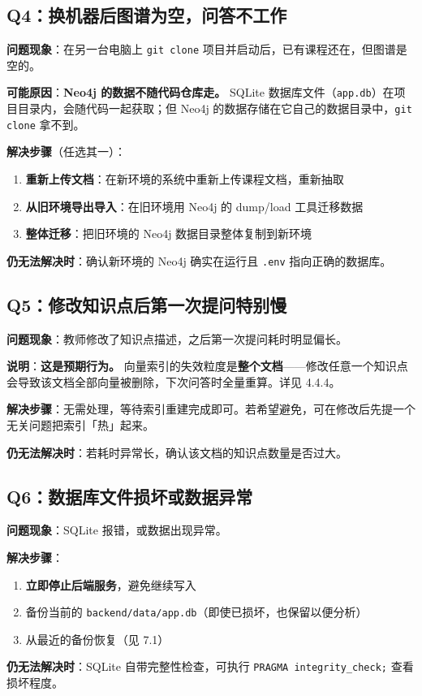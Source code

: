 \documentclass[UTF8,a4paper,11pt]{ctexrep}
\begin{document}
\subsection{Q4：换机器后图谱为空，问答不工作}

\textbf{问题现象}：在另一台电脑上 \texttt{git clone} 项目并启动后，已有课程还在，但图谱是空的。

\textbf{可能原因}：\textbf{Neo4j 的数据不随代码仓库走。} SQLite 数据库文件（\texttt{app.db}）在项目目录内，会随代码一起获取；但 Neo4j 的数据存储在它自己的数据目录中，\texttt{git clone} 拿不到。

\textbf{解决步骤}（任选其一）：

\begin{enumerate}
\item \textbf{重新上传文档}：在新环境的系统中重新上传课程文档，重新抽取
\item \textbf{从旧环境导出导入}：在旧环境用 Neo4j 的 dump/load 工具迁移数据
\item \textbf{整体迁移}：把旧环境的 Neo4j 数据目录整体复制到新环境
\end{enumerate}
\textbf{仍无法解决时}：确认新环境的 Neo4j 确实在运行且 \texttt{.env} 指向正确的数据库。


\subsection{Q5：修改知识点后第一次提问特别慢}

\textbf{问题现象}：教师修改了知识点描述，之后第一次提问耗时明显偏长。

\textbf{说明}：\textbf{这是预期行为。} 向量索引的失效粒度是\textbf{整个文档}——修改任意一个知识点会导致该文档全部向量被删除，下次问答时全量重算。详见 4.4.4。

\textbf{解决步骤}：无需处理，等待索引重建完成即可。若希望避免，可在修改后先提一个无关问题把索引「热」起来。

\textbf{仍无法解决时}：若耗时异常长，确认该文档的知识点数量是否过大。


\subsection{Q6：数据库文件损坏或数据异常}

\textbf{问题现象}：SQLite 报错，或数据出现异常。

\textbf{解决步骤}：

\begin{enumerate}
\item \textbf{立即停止后端服务}，避免继续写入
\item 备份当前的 \texttt{backend/data/app.db}（即使已损坏，也保留以便分析）
\item 从最近的备份恢复（见 7.1）
\end{enumerate}
\textbf{仍无法解决时}：SQLite 自带完整性检查，可执行 \texttt{PRAGMA integrity\_check;} 查看损坏程度。
\end{document}
